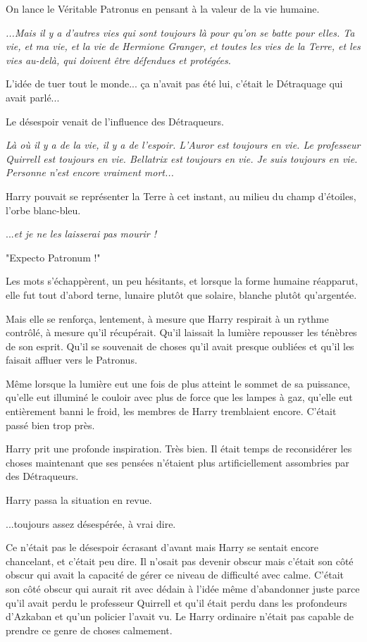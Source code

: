 On lance le Véritable Patronus en pensant à la valeur de la vie humaine.

\emph{...Mais il y a d'autres vies qui sont toujours là pour qu'on se batte pour elles. Ta vie, et ma vie, et la vie de Hermione Granger, et toutes les vies de la Terre, et les vies au-delà, qui doivent être défendues et protégées.} 

L'idée de tuer tout le monde... ça n'avait pas été lui, c'était le Détraquage qui avait parlé...

Le désespoir venait de l'influence des Détraqueurs.

\emph{Là où il y a de la vie, il y a de l'espoir. L'Auror est toujours en vie. Le professeur Quirrell est toujours en vie. Bellatrix est toujours en vie. Je suis toujours en vie. Personne n'est encore vraiment mort...} 

Harry pouvait se représenter la Terre à cet instant, au milieu du champ d'étoiles, l'orbe blanc-bleu.

...\emph{et je ne les laisserai pas mourir !} 

"Expecto Patronum !"

Les mots s'échappèrent, un peu hésitants, et lorsque la forme humaine réapparut, elle fut tout d'abord terne, lunaire plutôt que solaire, blanche plutôt qu'argentée.

Mais elle se renforça, lentement, à mesure que Harry respirait à un rythme contrôlé, à mesure qu'il récupérait. Qu'il laissait la lumière repousser les ténèbres de son esprit. Qu'il se souvenait de choses qu'il avait presque oubliées et qu'il les faisait affluer vers le Patronus.

Même lorsque la lumière eut une fois de plus atteint le sommet de sa puissance, qu'elle eut illuminé le couloir avec plus de force que les lampes à gaz, qu'elle eut entièrement banni le froid, les membres de Harry tremblaient encore. C'était passé bien trop près.

Harry prit une profonde inspiration. Très bien. Il était temps de reconsidérer les choses maintenant que ses pensées n'étaient plus artificiellement assombries par des Détraqueurs.

Harry passa la situation en revue.

...toujours assez désespérée, à vrai dire.

Ce n'était pas le désespoir écrasant d'avant mais Harry se sentait encore chancelant, et c'était peu dire. Il n'osait pas devenir obscur mais c'était son côté obscur qui avait la capacité de gérer ce niveau de difficulté avec calme. C'était son côté obscur qui aurait rit avec dédain à l'idée même d'abandonner juste parce qu'il avait perdu le professeur Quirrell et qu'il était perdu dans les profondeurs d'Azkaban et qu'un policier l'avait vu. Le Harry ordinaire n'était pas capable de prendre ce genre de choses calmement.

